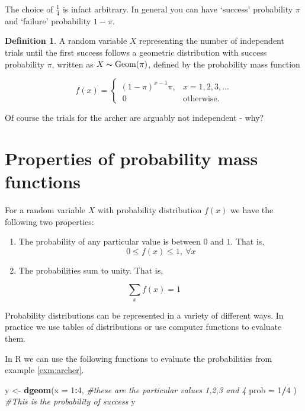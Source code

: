 \documentclass[
]{book}
\newenvironment{Shaded}{\begin{snugshade}}{\end{snugshade}}
\newcommand{\CommentTok}[1]{\textcolor[rgb]{0.56,0.35,0.01}{\textit{#1}}}
\newcommand{\DataTypeTok}[1]{\textcolor[rgb]{0.13,0.29,0.53}{#1}}
\newcommand{\DecValTok}[1]{\textcolor[rgb]{0.00,0.00,0.81}{#1}}
\newcommand{\KeywordTok}[1]{\textcolor[rgb]{0.13,0.29,0.53}{\textbf{#1}}}
\newcommand{\NormalTok}[1]{#1}
\newcommand{\OperatorTok}[1]{\textcolor[rgb]{0.81,0.36,0.00}{\textbf{#1}}}
\newcommand{\StringTok}[1]{\textcolor[rgb]{0.31,0.60,0.02}{#1}}
\theoremstyle{definition}
\newtheorem{definition}{Definition}[chapter]
\theoremstyle{definition}
\theoremstyle{definition}
\theoremstyle{definition}
\theoremstyle{remark}
\begin{document}
The choice of \(\frac{1}{4}\) is infact arbitrary. In general you can have `success' probability \(\pi\) and `failure' probability \(1-\pi\).

\begin{definition}
A random variable \(X\) representing the number of independent trials until the first success follows a geometric distribution with success probability \(\pi\), written as \(X \thicksim \text{Geom}(\pi)\), defined by the probability mass function

\begin{equation*}
  f(x)=\begin{cases}
    \left( 1-\pi \right)^{x-1}\pi , & x = 1, 2, 3, \dots \\
    \ 0 \ & \text{otherwise}.
  \end{cases}
\end{equation*}
\end{definition}

Of course the trials for the archer are arguably not independent - why?

\hypertarget{properties-of-probability-mass-functions}{%
\section{Properties of probability mass functions}\label{properties-of-probability-mass-functions}}

For a random variable \(X\) with probability distribution \(f(x)\) we have the following two properties:

\begin{enumerate}
\def\labelenumi{\arabic{enumi}.}
\item
  The probability of any particular value is between \(0\) and \(1\). That is,
  \[ 0 \leq f(x) \leq 1, \ \forall x\]
\item
  The probabilities sum to unity. That is,
\end{enumerate}

\[ \sum_{x} f(x)= 1\]

Probability distributions can be represented in a variety of different ways. In practice we use tables of distributions or use computer functions to evaluate them.

In R we can use the following functions to evaluate the probabilities from example \ref{exm:archer}.

\begin{Shaded}
\begin{Highlighting}[]
\NormalTok{y <-}\StringTok{ }\KeywordTok{dgeom}\NormalTok{(}\DataTypeTok{x =} \DecValTok{1}\OperatorTok{:}\DecValTok{4}\NormalTok{, }\CommentTok{#these are the particular values 1,2,3 and 4}
           \DataTypeTok{prob =} \DecValTok{1}\OperatorTok{/}\DecValTok{4}\NormalTok{ ) }\CommentTok{#This is the probability of success}
\NormalTok{y}
\end{Highlighting}
\end{Shaded}
\end{document}
